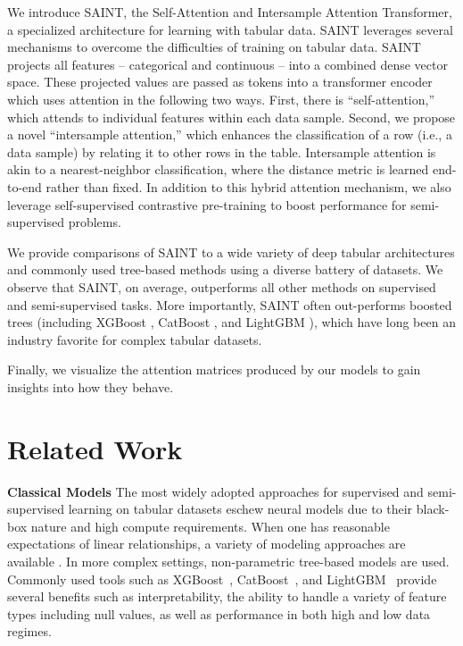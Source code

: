 We introduce SAINT, the Self-Attention and Intersample Attention Transformer, a specialized architecture for learning with tabular data. SAINT leverages several mechanisms to overcome the difficulties of training on tabular data. SAINT projects all features -- categorical and continuous -- into a combined dense vector space. These projected values are passed as tokens into a transformer encoder which uses attention in the following two ways. First, there is ``self-attention,'' which attends to individual features within each data sample. Second, we propose a novel ``intersample attention,'' which enhances the classification of a row (i.e., a data sample) by relating it to other rows in the table.  Intersample attention is akin to a nearest-neighbor classification, where the distance metric is learned end-to-end rather than fixed. In addition to this hybrid attention mechanism, we also leverage self-supervised contrastive pre-training to boost performance for semi-supervised problems.  

We provide comparisons of SAINT to a wide variety of deep tabular architectures and commonly used tree-based methods using a diverse battery of datasets. We observe that SAINT, on average, outperforms all other methods on supervised and semi-supervised tasks.  More importantly, SAINT often out-performs boosted trees (including  XGBoost \cite{chen2016xgboost}, CatBoost \cite{dorogush2018catboost}, and LightGBM \cite{ke2017lightgbm}), which have long been an industry favorite for complex tabular datasets.

Finally, we visualize the attention matrices produced by our models to gain insights into how they behave.

\section{Related Work}
\label{sec:related_work}
\textbf{Classical Models} The most widely adopted approaches for supervised and semi-supervised learning on tabular datasets eschew neural models due to their black-box nature and high compute requirements. When one has reasonable expectations of linear relationships, a variety of modeling approaches are available \cite{wright1995logistic,weisberg2005applied,starkweather2011multinomial,mcculloch2005generalized}. In more complex settings, non-parametric tree-based models are used. Commonly used tools such as XGBoost~\cite{chen2016xgboost}, CatBoost~\cite{dorogush2018catboost}, and LightGBM~\cite{ke2017lightgbm} provide several benefits such as interpretability, the ability to handle a variety of feature types including null values, as well as performance in both high and low data regimes.

